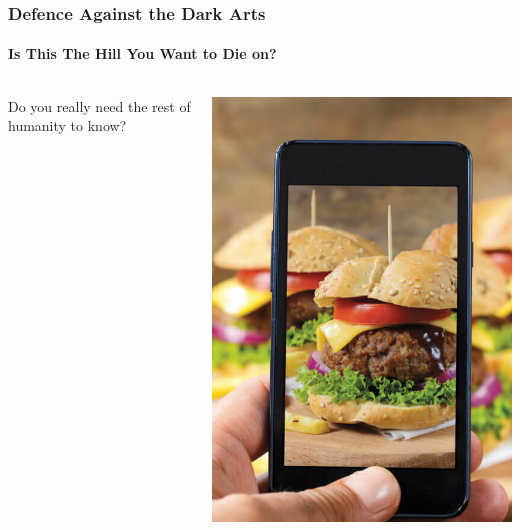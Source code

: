 \documentclass[aspectratio=169]{beamer}              %
\begin{document}
\begin{frame}[t]
	\frametitle{Defence Against the Dark Arts}
	\framesubtitle{Is This The Hill You Want to Die on?}

	    \begin{columns}
			\begin{column}{0.6\textwidth}
	
				\vfill
				Do you really need the rest of humanity to know?
				\vfill
		
			\end{column}
	
			\begin{column}{0.3\textwidth}
	
				\includegraphics[width = \textwidth, height = \textheight, keepaspectratio]{figures/food.jpg}
	
			\end{column}
	
		\end{columns}
	


\end{frame}
\end{document}
